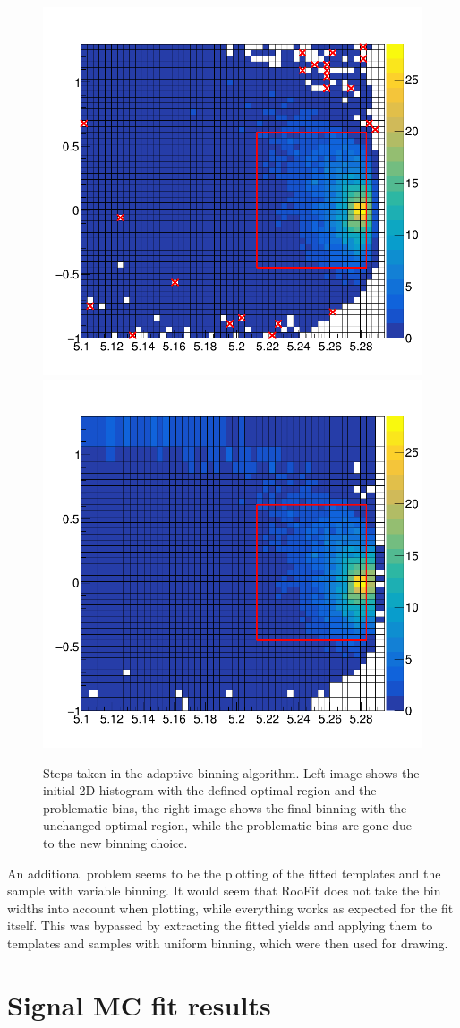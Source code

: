 \documentclass[headings=standardclasses,headings=big,oneside,a4paper,openany,12pt]{scrbook}
\begin{document}
\begin{figure}[H]
	\centering
	\captionsetup{width=0.8\linewidth}
	\includegraphics[width=0.49\linewidth]{fig/adaptive_1}
	\includegraphics[width=0.49\linewidth]{fig/adaptive_15}
	\caption{Steps taken in the adaptive binning algorithm. Left image shows the initial 2D histogram with the defined optimal region and the problematic bins, the right image shows the final binning with the unchanged optimal region, while the problematic bins are gone due to the new binning choice.}
	\label{fig:adapt}
\end{figure}

An additional problem seems to be the plotting of the fitted templates and the sample with variable binning. It would seem that RooFit does not take the bin widths into account when plotting, while everything works as expected for the fit itself. This was bypassed by extracting the fitted yields and applying them to templates and samples with uniform binning, which were then used for drawing.

\section{Signal MC fit results}\label{sec:signal-mc-fit-results}
\end{document}
